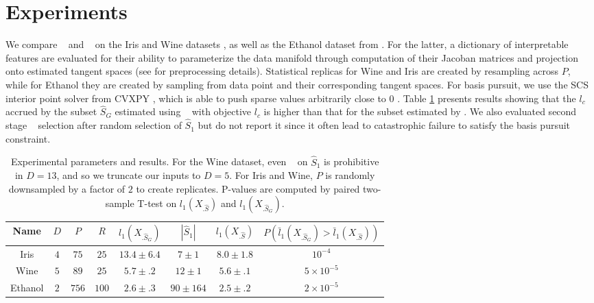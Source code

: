 \section{Experiments}
\label{sec:experiments}

We compare \tsip~ and \greedy~ on the Iris and Wine datasets \citep{misc_iris_53, misc_wine_109, scikit-learn}, as well as the Ethanol dataset from \citet{Chmiela2018-at, Koelle2022-ju}.
For the latter, a dictionary of interpretable features are evaluated for their ability to parameterize the data manifold through computation of their Jacoban matrices and projection onto estimated tangent spaces (see \citet{Koelle2022-ju} for preprocessing details).
Statistical replicas for Wine and Iris are created by resampling across $P$, while for Ethanol they are created by sampling from data point and their corresponding tangent spaces.
For basis pursuit, we use the SCS interior point solver \citep{ocpb:16} from CVXPY \citep{diamond2016cvxpy, agrawal2018rewriting}, which is able to push sparse values arbitrarily close to 0 \citep{cvxpy_sparse_solution}.
Table \ref{tab:experiments} presents results showing that the $l_c$ accrued by the subset $\widehat S_{G}$ estimated using \greedy~ with objective $l_c$ is higher than that for the subset estimated by \tsip.
We also evaluated second stage \brute~ selection after random selection of $\widehat S_1$ but do not report it since it often lead to catastrophic failure to satisfy the basis pursuit constraint.

\begin{table}[h!]
\centering
\begin{tabular}{|c|c|c|c|c|c|c|c|}
\hline
Name & $D$ & $P$ & $R$ & $l_1(X_{.\widehat S_{G}})$ & $ |\widehat S_1 | $& $l_1(X_{.\widehat S})$ & $P(\bar l_1(X_{.\widehat S_{G}}) > \bar l_1(X_{.\widehat S}))$  \\ \hline
Iris & $4$ & $75$ & $25$ & $13.4 \pm 6.4$ & $7 \pm 1$ &  $8.0 \pm 1.8$ & $10^{-4}$\\ \hline 
Wine & $5$ & $89$ & $25$  & $5.7 \pm .2$ & $12 \pm 1$ & $5.6 \pm .1$ & $5 \times 10^{-5}$ \\ \hline
Ethanol & $2$ & $756$ & $100$ & $2.6\pm .3$  & $90 \pm 164$  & $2.5\pm .2$& $2 \times 10^{-5}$ \\ \hline
\end{tabular}
\caption{Experimental parameters and results.
For the Wine dataset, even \brute~ on $\widehat { S}_1$ is prohibitive in $D=13$, and so we truncate our inputs to $D=5$.
For Iris and Wine, $P$ is randomly downsampled by a factor of $2$ to create replicates.
P-values are computed by paired two-sample T-test on  $l_1(X_{.\widehat S})$ and $l_1(X_{.\widehat S_{G}})$.
}
\label{tab:experiments}
\end{table}

